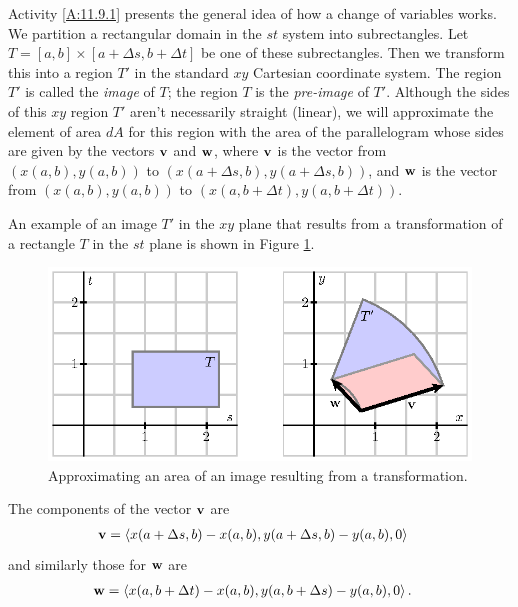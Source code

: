 

Activity \ref{A:11.9.1} presents the general idea of how a change of variables works. We partition a rectangular domain in the $st$ system into subrectangles. Let $T = [a, b] \times [a+\Delta s, b+\Delta t]$ be one of these subrectangles. Then we transform this into a region $T'$ in the standard $xy$ Cartesian coordinate system. The region $T'$ is called the \emph{image} of $T$; the region $T$ is the \emph{pre-image} of $T'$.  Although the sides of this $xy$ region $T'$ aren't necessarily straight (linear), we will approximate the element of area $dA$ for this region with the area of the parallelogram whose sides are given by the vectors $\mathbf{v}$ and $\mathbf{w}$, where $\mathbf{v}$ is the vector from $(x(a, b), y(a, b))$ to $(x(a + \Delta s, b), y(a + \Delta s, b))$, and $\mathbf{w}$ is the vector from $(x(a, b), y(a, b))$ to $(x(a, b + \Delta t), y(a, b + \Delta t))$.

An example of an image $T'$ in the $xy$ plane that results from a transformation of a rectangle $T$ in the $st$ plane is shown in Figure \ref{F:11.9.Change_vars_ex}.
\begin{figure}[ht]
\begin{center}
  \includegraphics{figures/fig_11_9_general_change.eps}
\end{center}
\caption{Approximating an area of an image resulting from a transformation.}
\label{F:11.9.Change_vars_ex}
\end{figure}

The components of the vector $\mathbf{v}$ are
\begin{align*}
\mathbf{v} &= \left\langle x(a+ \Delta s, b) - x(a,b), y(a+ \Delta s, b) - y(a,b), 0 \right\rangle
\end{align*}
and similarly those for $\mathbf{w}$ are
\begin{align*}
\mathbf{w} &= \left\langle x(a, b+ \Delta t) - x(a,b), y(a, b+ \Delta s) - y(a,b), 0 \right\rangle.
\end{align*}

